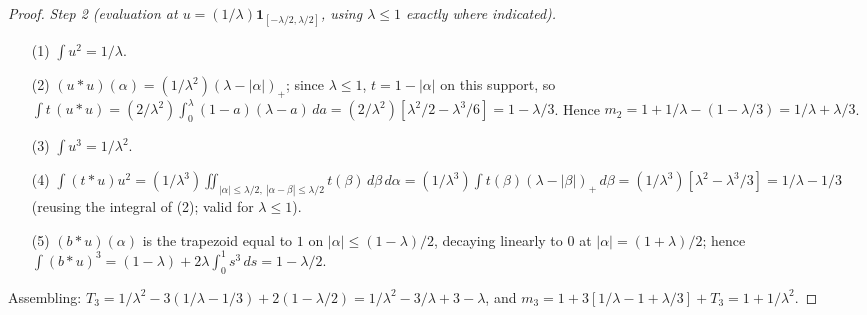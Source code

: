 \documentclass[11pt]{article}
\theoremstyle{plain}
\theoremstyle{definition}
\theoremstyle{remark}
\newcommand{\one}{\mathbf{1}}
\begin{document}
\begin{proof}
\emph{Step 2 (evaluation at $u = (1/\lambda)\one_{[-\lambda/2, \lambda/2]}$,
using $\lambda \le 1$ exactly where indicated).}
\begin{enumerate}
\item[(1)] $\int u^2 = 1/\lambda$.
\item[(2)] $(u * u)(\alpha) = (1/\lambda^2)(\lambda - |\alpha|)_+$; since
  $\lambda \le 1$, $t = 1 - |\alpha|$ on this support, so
  $\int t\,(u * u) = (2/\lambda^2) \int_0^\lambda (1 - a)(\lambda - a)\, da
   = (2/\lambda^2)[\lambda^2/2 - \lambda^3/6] = 1 - \lambda/3$. Hence
  $m_2 = 1 + 1/\lambda - (1 - \lambda/3) = 1/\lambda + \lambda/3$.
\item[(3)] $\int u^3 = 1/\lambda^2$.
\item[(4)] $\int (t * u) u^2
  = (1/\lambda^3) \iint_{|\alpha| \le \lambda/2,\ |\alpha - \beta| \le \lambda/2}
    t(\beta)\, d\beta\, d\alpha
  = (1/\lambda^3) \int t(\beta)(\lambda - |\beta|)_+\, d\beta
  = (1/\lambda^3)[\lambda^2 - \lambda^3/3] = 1/\lambda - 1/3$
  (reusing the integral of (2); valid for $\lambda \le 1$).
\item[(5)] $(b * u)(\alpha)$ is the trapezoid equal to $1$ on
  $|\alpha| \le (1 - \lambda)/2$, decaying linearly to $0$ at
  $|\alpha| = (1 + \lambda)/2$; hence
  $\int (b * u)^3 = (1 - \lambda) + 2\lambda \int_0^1 s^3\, ds
   = 1 - \lambda/2$.
\end{enumerate}
Assembling: $T_3 = 1/\lambda^2 - 3(1/\lambda - 1/3) + 2(1 - \lambda/2)
= 1/\lambda^2 - 3/\lambda + 3 - \lambda$, and
$m_3 = 1 + 3[1/\lambda - 1 + \lambda/3] + T_3 = 1 + 1/\lambda^2$.
\end{proof}
\end{document}
